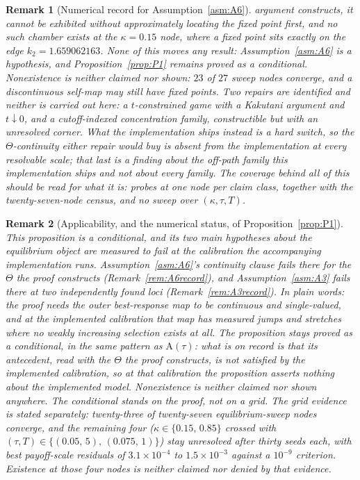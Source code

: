 \documentclass[11pt]{article}
\newtheorem{remark}{Remark}
\newcommand{\Atau}{\mathrm{A}(\tau)}
\begin{document}
\begin{remark}[Numerical record for Assumption~\ref{asm:A6}]
argument constructs, it cannot be exhibited without approximately locating the fixed point first,
and no such chamber exists at the $\kappa = 0.15$ node, where a fixed point sits exactly on the edge
$k_2 = 1.659062163$. None of this moves any result: Assumption~\ref{asm:A6} is a hypothesis, and
Proposition~\ref{prop:P1} remains proved as a conditional. Nonexistence is neither claimed nor shown:
$23$ of $27$ sweep nodes converge, and a discontinuous self-map may still have fixed points. Two
repairs are identified and neither is carried out here: a $t$-constrained game with a Kakutani
argument and $t \downarrow 0$, and a cutoff-indexed concentration family, constructible but with an
unresolved corner. What the implementation ships instead is a hard switch, so the
$\Theta$-continuity either repair would buy is absent from the implementation at every resolvable
scale; that last is a finding about the off-path family this implementation ships and not about
every family. The coverage behind all of this should be read for what it is: probes at one node per
claim class, together with the twenty-seven-node census, and no sweep over $(\kappa,\tau,T)$.
\end{remark}

\begin{remark}[Applicability, and the numerical status, of Proposition~\ref{prop:P1}]
\label{rem:P1record}
This proposition is a conditional, and its two main hypotheses about the equilibrium object are
measured to fail at the calibration the accompanying implementation runs. Assumption~\ref{asm:A6}'s
continuity clause fails there for the $\Theta$ the proof constructs (Remark~\ref{rem:A6record}), and
Assumption~\ref{asm:A3} fails there at two independently found loci (Remark~\ref{rem:A3record}). In
plain words: the proof needs the outer best-response map to be continuous and single-valued, and at
the implemented calibration that map has measured jumps and stretches where no weakly increasing
selection exists at all. The proposition stays proved as a conditional, in the same pattern as
$\Atau$: what is on record is that its antecedent, read with the $\Theta$ the proof constructs,
is not satisfied by the implemented calibration, so at that calibration the proposition asserts
nothing about the implemented model. Nonexistence is neither claimed nor shown anywhere. The
conditional stands on the proof, not on a grid. The grid evidence is stated separately: twenty-three of
twenty-seven equilibrium-sweep nodes converge, and the
remaining four ($\kappa \in \{0.15,\,0.85\}$ crossed with $(\tau,T) \in \{(0.05,\,5),\,(0.075,\,
1)\}$) stay unresolved after thirty seeds each, with best payoff-scale residuals of
$3.1\times10^{-4}$ to $1.5\times10^{-3}$ against a $10^{-9}$ criterion. Existence at those four nodes is neither claimed nor denied
by that evidence.
\end{remark}
\end{document}
